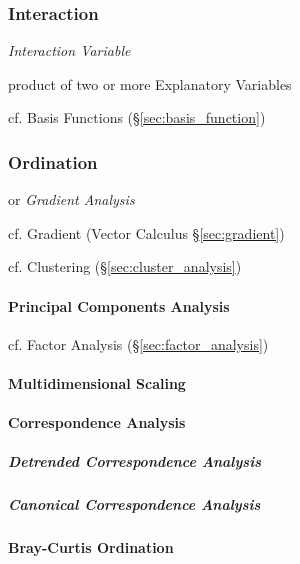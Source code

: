 \subsubsection{Interaction}\label{sec:interaction}

\emph{Interaction Variable}

product of two or more Explanatory Variables

cf. Basis Functions (\S\ref{sec:basis_function})



\subsubsection{Ordination}\label{sec:ordination}

or \emph{Gradient Analysis}

cf. Gradient (Vector Calculus \S\ref{sec:gradient})

cf. Clustering (\S\ref{sec:cluster_analysis})



\paragraph{Principal Components Analysis}\label{sec:pca}\hfill

cf. Factor Analysis (\S\ref{sec:factor_analysis})



\paragraph{Multidimensional Scaling}\label{sec:multidimensional_scaling}\hfill

\paragraph{Correspondence Analysis}\label{sec:correspondence_analysis}\hfill

\subparagraph{Detrended Correspondence Analysis}
\label{sec:detrended_correspondence}\hfill

\subparagraph{Canonical Correspondence Analysis}
\label{sec:canonical_correspondence}\hfill



\paragraph{Bray-Curtis Ordination}\label{sec:bray_curtis_ordination}\hfill

